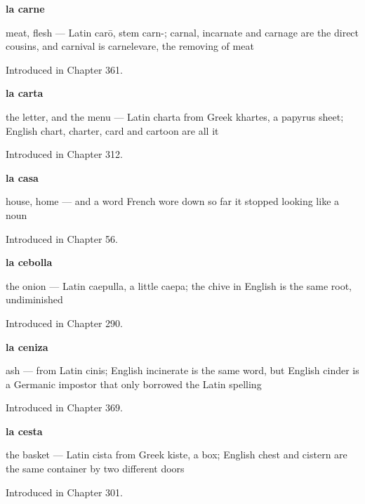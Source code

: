 \noindent\begin{minipage}[t]{\linewidth}
\raggedright
\textbf{la carne}\par
\small meat, flesh — Latin carō, stem carn-; carnal, incarnate and carnage are the direct cousins, and carnival is carnelevare, the removing of meat\par
\footnotesize Introduced in Chapter 361.
\end{minipage}\par\medskip

\noindent\begin{minipage}[t]{\linewidth}
\raggedright
\textbf{la carta}\par
\small the letter, and the menu — Latin charta from Greek khartes, a papyrus sheet; English chart, charter, card and cartoon are all it\par
\footnotesize Introduced in Chapter 312.
\end{minipage}\par\medskip

\noindent\begin{minipage}[t]{\linewidth}
\raggedright
\textbf{la casa}\par
\small house, home — and a word French wore down so far it stopped looking like a noun\par
\footnotesize Introduced in Chapter 56.
\end{minipage}\par\medskip

\noindent\begin{minipage}[t]{\linewidth}
\raggedright
\textbf{la cebolla}\par
\small the onion — Latin caepulla, a little caepa; the chive in English is the same root, undiminished\par
\footnotesize Introduced in Chapter 290.
\end{minipage}\par\medskip

\noindent\begin{minipage}[t]{\linewidth}
\raggedright
\textbf{la ceniza}\par
\small ash — from Latin cinis; English incinerate is the same word, but English cinder is a Germanic impostor that only borrowed the Latin spelling\par
\footnotesize Introduced in Chapter 369.
\end{minipage}\par\medskip

\noindent\begin{minipage}[t]{\linewidth}
\raggedright
\textbf{la cesta}\par
\small the basket — Latin cista from Greek kiste, a box; English chest and cistern are the same container by two different doors\par
\footnotesize Introduced in Chapter 301.
\end{minipage}\par\medskip

